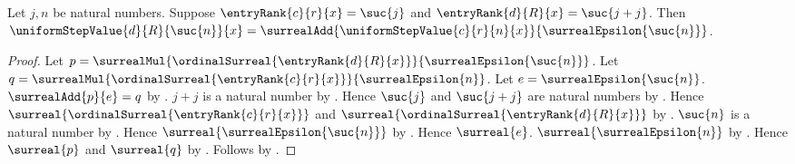 \begin{proposition}\label{uniform_step_value_at_inserted_rank}
    Let $j,n$ be natural numbers.
    Suppose $\entryRank{c}{r}{x}=\suc{j}$ and
        $\entryRank{d}{R}{x}=\suc{j+j}$.
    Then
        $\uniformStepValue{d}{R}{\suc{n}}{x}
        =\surrealAdd{\uniformStepValue{c}{r}{n}{x}}
            {\surrealEpsilon{\suc{n}}}$.
\end{proposition}
\begin{proof}
    Let $p=\surrealMul{
        \ordinalSurreal{\entryRank{d}{R}{x}}}
        {\surrealEpsilon{\suc{n}}}$.
    Let $q=\surrealMul{
        \ordinalSurreal{\entryRank{c}{r}{x}}}
        {\surrealEpsilon{n}}$.
    Let $e=\surrealEpsilon{\suc{n}}$.
    $\surrealAdd{p}{e}=q$
        by .
    $j+j$ is a natural number by .
    Hence $\suc{j}$ and $\suc{j+j}$ are natural numbers
        by .
    Hence $\surreal{\ordinalSurreal{\entryRank{c}{r}{x}}}$ and
        $\surreal{\ordinalSurreal{\entryRank{d}{R}{x}}}$
        by .
    $\suc{n}$ is a natural number by .
    Hence $\surreal{\surrealEpsilon{\suc{n}}}$
        by .
    Hence $\surreal{e}$.
    $\surreal{\surrealEpsilon{n}}$
        by .
    Hence $\surreal{p}$ and $\surreal{q}$
        by .
    Follows by
        .
\end{proof}

